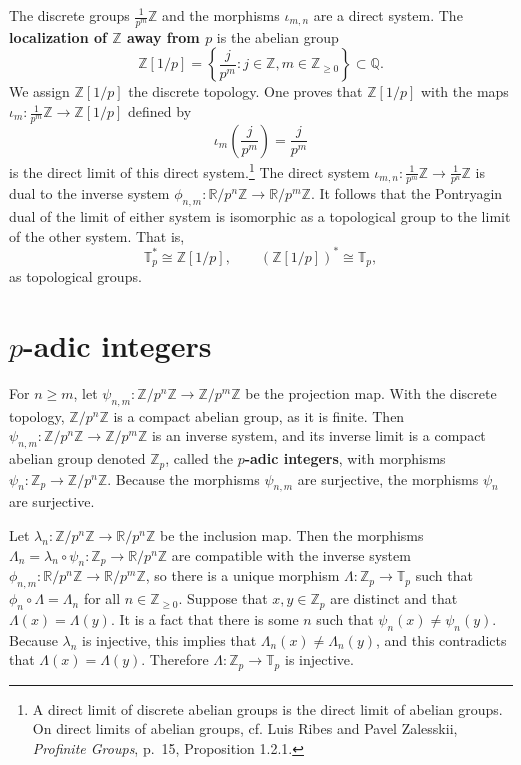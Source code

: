 \documentclass{article}
\theoremstyle{definition}
\begin{document}
 \begin{center}
\end{center}
The discrete groups $\frac{1}{p^m}\mathbb{Z}$ and the morphisms $\iota_{m,n}$ are a direct system. The \textbf{localization of $\mathbb{Z}$
away from $p$} is the abelian group
\[
\mathbb{Z}[1/p] = \left\{ \frac{j}{p^m}: j \in \mathbb{Z}, m \in \mathbb{Z}_{\geq 0}\right\} \subset \mathbb{Q}.
\]
We assign $\mathbb{Z}[1/p]$ the discrete topology. One proves that
$\mathbb{Z}[1/p]$ with the maps $\iota_m:\frac{1}{p^m}\mathbb{Z} \to \mathbb{Z}[1/p]$ defined by
\[
\iota_m\left(\frac{j}{p^m}\right) = \frac{j}{p^m}
\]
is the direct limit of this direct system.\footnote{A direct limit of discrete abelian groups
is the direct limit of abelian groups. On direct limits of abelian groups, cf. Luis Ribes and Pavel Zalesskii, {\em Profinite Groups}, p.~15, Proposition 1.2.1.}
The direct system $\iota_{m,n}:\frac{1}{p^m} \mathbb{Z} \to \frac{1}{p^n} \mathbb{Z}$
is dual to the inverse system $\phi_{n,m}:\mathbb{R}/p^n\mathbb{Z} \to \mathbb{R}/p^m \mathbb{Z}$. It follows that
the Pontryagin dual of the limit of either system  is isomorphic as a topological group to the limit of the other system. That is,
\[
\mathbb{T}_p^* \cong \mathbb{Z}[1/p], \qquad (\mathbb{Z}[1/p])^* \cong \mathbb{T}_p,
\]
as topological groups.


\section{$p$-adic integers}
For $n \geq m$, let $\psi_{n,m}:\mathbb{Z}/p^n \mathbb{Z} \to \mathbb{Z}/p^m \mathbb{Z}$ be the projection map. With the discrete topology, 
$\mathbb{Z}/p^n\mathbb{Z}$ is a compact abelian group, as it is finite. Then $\psi_{n,m}:\mathbb{Z}/p^n \mathbb{Z} \to \mathbb{Z}/p^m\mathbb{Z}$ is an inverse system,
and its inverse limit is a compact abelian group denoted $\mathbb{Z}_p$, called the \textbf{$p$-adic integers}, with morphisms $\psi_n:\mathbb{Z}_p \to \mathbb{Z}/p^n\mathbb{Z}$. 
Because the morphisms $\psi_{n,m}$ are surjective, the morphisms $\psi_n$ are surjective.

Let $\lambda_n:\mathbb{Z}/p^n \mathbb{Z} \to \mathbb{R}/p^n\mathbb{Z}$ be the inclusion map. Then the morphisms $\Lambda_n = \lambda_n \circ \psi_n:\mathbb{Z}_p \to 
\mathbb{R}/p^n \mathbb{Z}$ are compatible with the inverse system $\phi_{n,m}:\mathbb{R}/p^n \mathbb{Z} \to \mathbb{R}/p^m \mathbb{Z}$, so there is a unique morphism
$\Lambda:\mathbb{Z}_p \to \mathbb{T}_p$ such that $\phi_n \circ \Lambda = \Lambda_n$ for all $n \in \mathbb{Z}_{\geq 0}$. 
Suppose that $x,y \in \mathbb{Z}_p$ are distinct and that $\Lambda(x) = \Lambda(y)$. It is a fact that there is some $n$ such that $\psi_n(x) \neq \psi_n(y)$.  Because $\lambda_n$ is injective,
this implies that $\Lambda_n(x) \neq \Lambda_n(y)$, and this contradicts that $\Lambda(x) = \Lambda(y)$. Therefore $\Lambda:\mathbb{Z}_p
\to \mathbb{T}_p$ is injective.
\end{document}
